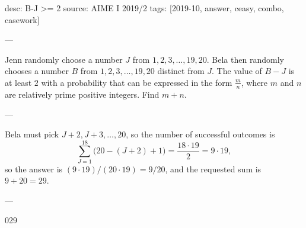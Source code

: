 desc: B-J >= 2
source: AIME I 2019/2
tags: [2019-10, answer, ceasy, combo, casework]

---

Jenn randomly choose a number $J$ from $1,2,3,\ldots,19,20$. Bela then randomly chooses a number $B$ from $1,2,3,\ldots,19,20$ distinct from $J$. The value of $B-J$ is at least $2$ with a probability that can be expressed in the form $\tfrac mn$, where $m$ and $n$ are relatively prime positive integers. Find $m+n$.

---

Bela must pick $J+2,J+3,\ldots,20$, so the number of successful outcomes is \[\sum_{J=1}^{18}\big(20-(J+2)+1\big)=\frac{18\cdot 19}2=9\cdot 19,\]
so the answer is $(9\cdot 19)/(20\cdot 19)=9/20$, and the requested sum is $9+20=29$.

---

029
